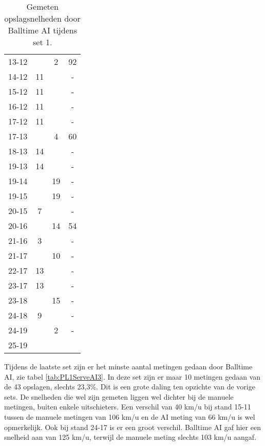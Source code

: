 \begin{table}[ht!]
\begin{tabular}{|c|c|c|c|}
    13-12 & & 2 & 92 \\
    14-12 & 11 & & - \\
    15-12 & 11 & & - \\
    16-12 & 11 & & - \\
    17-12 & 11 & & - \\
    17-13 & & 4 & 60 \\
    18-13 & 14 & & - \\
    19-13 & 14 & & - \\
    19-14 & & 19 & - \\
    19-15 & & 19 & - \\
    20-15 & 7 & & - \\
    20-16 & & 14 & 54 \\
    21-16 & 3 & & - \\
    21-17 & & 10 & - \\
    22-17 & 13 & & - \\
    23-17 & 13 & & - \\
    23-18 & & 15 & - \\
    24-18 & 9 & & - \\
    24-19 & & 2 & - \\
    25-19 & & & \\ \hline
  \end{tabular}
  \caption[Gemeten opslagsnelheden door Balltime AI tijdens set 1]{\label{tab:PL1ServeAI1}Gemeten opslagsnelheden door Balltime AI tijdens set 1.}
\end{table}

Tijdens de laatste set zijn er het minste aantal metingen gedaan door Balltime AI, zie tabel \ref{tab:PL1ServeAI3}. In deze set zijn er maar 10 metingen gedaan van de 43 opslagen, slechts 23,3\%. Dit is een grote daling ten opzichte van de vorige sets. De snelheden die wel zijn gemeten liggen wel dichter bij de manuele metingen, buiten enkele uitschieters. Een verschil van 40 km/u bij stand 15-11 tussen de manuele metingen van 106 km/u en de AI meting van 66 km/u is wel opmerkelijk. Ook bij stand 24-17 is er een groot verschil. Balltime AI gaf hier een snelheid aan van 125 km/u, terwijl de manuele meting slechts 103 km/u aangaf.


